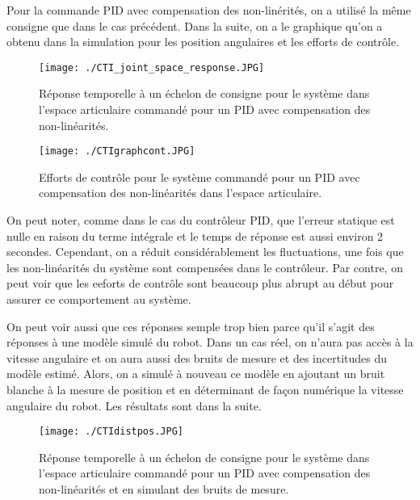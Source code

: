 Pour la commande PID avec compensation des non-linérités, on a utilisé la même consigne que dans le cas précédent. Dans la suite, on a le graphique qu'on a obtenu dans la simulation pour les position angulaires et les efforts de contrôle.

\begin{figure}[H]
	\begin{center}	
		\texttt{[image: ./CTI\_joint\_space\_response.JPG]}
		\caption{Réponse temporelle à un échelon de consigne pour le système dans l'espace articulaire commandé pour un PID avec compensation des non-linéarités.}
		\label{fig:CTI_joint_space_response}
	\end{center}
\end{figure}

\begin{figure}[H]
	\begin{center}	
		\texttt{[image: ./CTIgraphcont.JPG]}
		\caption{Efforts de contrôle pour le système commandé pour un PID avec compensation des non-linéarités dans l'espace articulaire.}
		\label{fig:CTIgraphcont}
	\end{center}
\end{figure}

On peut noter, comme dans le cas du contrôleur PID, que l'erreur statique est nulle en raison du terme intégrale et le temps de réponse est aussi environ 2 secondes. Cependant, on a réduit considérablement les fluctuations, une fois que les non-linéarités du système sont compensées dans le contrôleur. Par contre, on peut voir que les eeforts de contrôle sont beaucoup plus abrupt au début pour assurer ce comportement au système.

On peut voir aussi que ces réponses semple trop bien parce qu'il s'agit des réponses à une modèle simulé du robot. Dans un cas réel, on n'aura pas accès à la vitesse angulaire et on aura aussi des bruits de mesure et des  incertitudes du modèle estimé. Alors, on a simulé à nouveau ce modèle en ajoutant un bruit blanche à la mesure de position et en déterminant de façon numérique la vitesse angulaire du robot. Les résultats sont dans la suite.

\begin{figure}[H]
	\begin{center}	
		\texttt{[image: ./CTIdistpos.JPG]}
		\caption{Réponse temporelle à un échelon de consigne pour le système dans l'espace articulaire commandé pour un PID avec compensation des non-linéarités et en simulant des bruits de mesure.}
		\label{fig:CTIdistpos}
	\end{center}
\end{figure}

